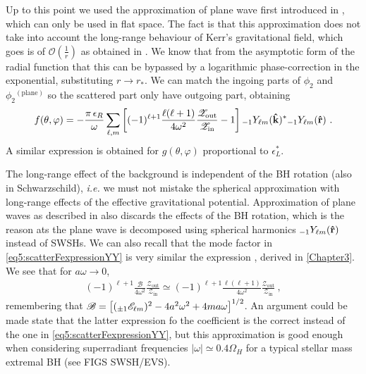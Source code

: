 Up to this point we used the approximation of plane wave first introduced in , which can only be used in flat space. The fact is that this approximation does not take into account the long-range behaviour of Kerr's gravitational field, which goes is of $\mathscr{O}(\tfrac{1}{r})$ as obtained in .
We know that from the asymptotic form of the radial function that this can be bypassed by a logarithmic phase-correction in the exponential, substituting $r\to r_{*}$.
We can match the ingoing parts of $\phi_2$ and $\phi_2{}^{(\mathrm{plane})}$ so the scattered part only have outgoing part, obtaining
\begin{align}
    \label{eq5:scatterFexpressionYY}
    f(\theta,\varphi) = - \frac{\pi \,\epsilon_R}{\omega} \sum_{\ell,m} \left[
    (-1)^{\ell+1} \frac{\ell(\ell+1)}{4 \omega^2 }
    \frac{\mathscr{Z}_\mathrm{out}}{\mathscr{Z}_\mathrm{in}} - 1 \right]
    \uu[-1]{Y}{\ell m}(\mathbf{\hat{k}})^{*} \uu[-1]{Y}{\ell m}(\mathbf{\hat{r}}) ~.
\end{align}
A similar expression is obtained for $g(\theta,\varphi)$ proportional to $\epsilon_L^*$.

The long-range effect of the background is independent of the BH rotation (also in Schwarzschild), \emph{i.e.} we must not mistake the spherical approximation with long-range effects of the effective gravitational potential.
Approximation of plane waves as described in  also discards the effects of the BH rotation, which is the reason ats the plane wave is decomposed using spherical harmonics $\uu[-1]{Y}{\ell m}(\mathbf{\hat{r}})$ instead of SWSHs.
We can also recall that the mode factor in \eqref{eq5:scatterFexpressionYY} is very similar the expression , derived in \cref{Chapter3}.
We see that for $a\omega \to 0$,
\begin{align}
    \label{eq5:phaseFactor}
    (-1)^{\ell+1} \frac{\mathscr{B}}{4 \omega^2} \frac{\mathscr{Z}_\mathrm{out}}{\mathscr{Z}_\mathrm{in}} \simeq (-1)^{\ell+1} \frac{\ell(\ell+1)}{4 \omega^2} \frac{\mathscr{Z}_\mathrm{out}}{\mathscr{Z}_\mathrm{in}} ~,
\end{align}
remembering that $\mathscr{B} = \left[ (\uu[\pm 1]{\mathscr{E}}{\ell m})^2 - 4 a^2 \omega^2 + 4 m a \omega \right]^{1/2}$.
An argument could be made state that the latter expression fo the coefficient is the correct instead of the one in \eqref{eq5:scatterFexpressionYY}, but this approximation is good enough when considering superradiant frequencies $|\omega| \simeq 0.4 \Omega_H$ for a typical stellar mass extremal BH (see FIGS SWSH/EVS).

